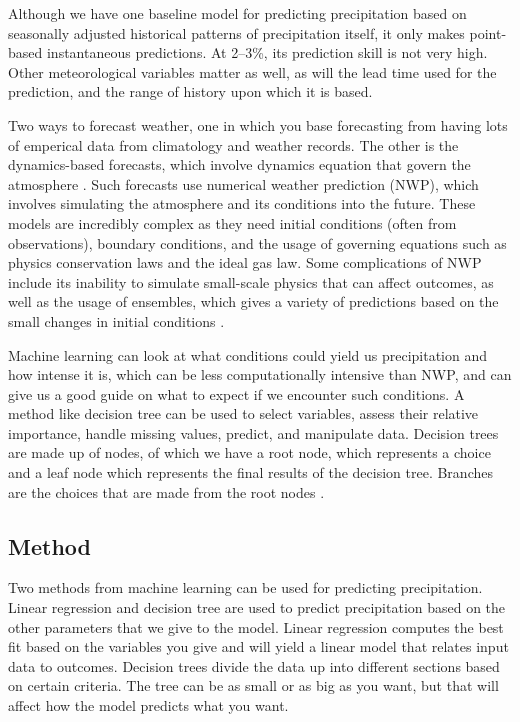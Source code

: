\documentclass[11pt]{report}
\begin{document}
Although we have one baseline model for predicting precipitation based on
seasonally adjusted historical patterns of precipitation itself, it only
makes point-based instantaneous predictions.  At 2--3\%, its prediction
skill is not very high. Other meteorological variables matter as well, as
will the lead time used for the prediction, and the range of history upon
which it is based.

Two ways to forecast weather, one in which you base forecasting from having lots of emperical data from climatology and weather records. The other is the dynamics-based forecasts, which involve dynamics equation that govern the atmosphere \cite[]{WF}. Such forecasts use numerical weather prediction (NWP),
which involves simulating the atmosphere and its conditions into the
future. These models are incredibly complex as they need initial conditions
(often from observations), boundary conditions, and the usage of governing
equations such as physics conservation laws and the ideal gas law. Some
complications of NWP include its inability to simulate small-scale physics
that can affect outcomes, as well as the usage of ensembles, which gives a
variety of predictions based on the small changes in initial conditions
\cite[]{NWP}. 

Machine learning can look at what conditions could yield us precipitation
and how intense it is, which can be less computationally intensive than NWP,
and can give us a good guide on what to expect if we encounter such
conditions.  A method like decision tree can be used to select variables,
assess their relative importance, handle missing values, predict, and
manipulate data. Decision trees are made up of nodes, of which we have a
root node, which represents a choice and a leaf node which represents the
final results of the decision tree. Branches are the choices that are made
from the root nodes \cite[]{DT}.


\subsection{Method}

Two methods from machine learning can be used for predicting
precipitation. Linear regression and decision tree are used to predict
precipitation based on the other parameters that we give to the
model. Linear regression computes the best fit based on the variables you
give and will yield a linear model that relates input data to outcomes.
Decision trees divide the data up into different sections based on certain
criteria. The tree can be as small or as big as you want, but that will
affect how the model predicts what you want.
\end{document}
